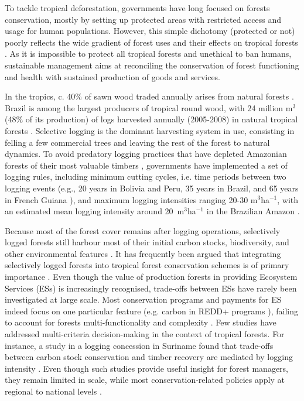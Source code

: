 \documentclass{article}
\begin{document}
To tackle tropical deforestation, governments have long focused on forests conservation, mostly by setting up protected areas with restricted access and usage for human populations. However, this simple dichotomy (protected or not) poorly reflects the wide gradient of forest uses and their effects on tropical forests \cite{Gibson2011,DeCastroSolar2015}. As it is impossible to protect all tropical forests and unethical to ban humans, sustainable management aims at reconciling the conservation of forest functioning and health with sustained production of goods and services. 

In the tropics, c. 40\% of sawn wood traded annually arises from natural forests \cite{Payn2015}. Brazil is among the largest producers of tropical round wood, with 24 million m$^3$ (48\% of its production) of logs harvested annually (2005-2008) in natural tropical forests \cite{Blaser2011}. Selective logging is the dominant harvesting system in use, consisting in felling a few commercial trees and leaving the rest of the forest to natural dynamics. 
To avoid predatory logging practices that have depleted Amazonian forests of their most valuable timbers \cite{Richardson2016}, governments have implemented a set of logging rules, including minimum cutting cycles, i.e. time periods between two logging events (e.g., 20 years in Bolivia and Peru, 35 years in Brazil, and 65 years in French Guiana \cite{Blaser2011}), and maximum logging intensities ranging 20-30 m$^3$ha$^{-1}$, with an estimated mean logging intensity around 20~m$^3$ha$^{-1}$ in the Brazilian Amazon \cite{Asner2005}.

Because most of the forest cover remains after logging operations, selectively logged forests still harbour most of their initial carbon stocks, biodiversity, and other environmental features \cite{Putz2012}. It has frequently been argued that integrating selectively logged forests into tropical forest conservation schemes is of primary importance \cite{Edwards2014a}. Even though the value of production forests in providing Ecosystem Services (ESs) is increasingly recognised, trade-offs between ESs have rarely been investigated at large scale. Most conservation programs and payments for ES indeed focus on one particular feature (e.g. carbon in REDD+ programs \cite{Laing2016}), failing to account for forests multi-functionality and complexity \cite{VanderPlas2017}. Few studies have addressed multi-criteria decision-making in the context of tropical forests. For instance, a study in a logging concession in Suriname found that trade-offs between carbon stock conservation and timber recovery are mediated by logging intensity \cite{Roopsind2018}. Even though such studies provide useful insight for forest managers, they remain limited in scale, while most conservation-related policies apply at regional to national levels \cite{Hein2006b}. 
\end{document}
